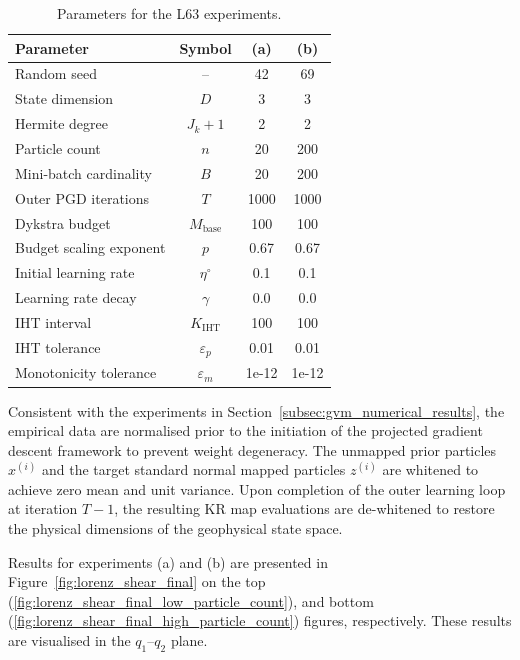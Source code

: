 \begin{table}[htbp]
    \centering
    \caption{Parameters for the L63 experiments.}
    \begin{tabular}{lccc}
        \toprule
        \textbf{Parameter} & \textbf{Symbol} & \textbf{(a)} & \textbf{(b)} \\
        \midrule
        Random seed & --                            & 42 & 69 \\
        State dimension & $D$                       & 3 & 3 \\
        Hermite degree & $J_k + 1$                  & 2 & 2 \\
        Particle count & $n$                        & 20 & 200 \\
        Mini-batch cardinality & $B$                & 20 & 200 \\
        Outer PGD iterations & $T$                  & 1000 & 1000 \\
        Dykstra budget & $M_{\mathrm{base}}$        & 100 & 100 \\
        Budget scaling exponent & $p$               & 0.67 & 0.67 \\
        Initial learning rate & $\eta^\circ$        & 0.1 & 0.1 \\
        Learning rate decay & $\gamma$              & 0.0 & 0.0 \\
        IHT interval & $K_{\mathrm{IHT}}$           & 100 & 100 \\
        IHT tolerance & $\varepsilon_p$             & 0.01 & 0.01 \\
        Monotonicity tolerance & $\varepsilon_m$    & 1e-12 & 1e-12 \\
        \bottomrule
    \end{tabular}
    \label{tab:lorenz_optimisation_parameters}
\end{table}

Consistent with the experiments in Section~\ref{subsec:gvm_numerical_results}, the empirical data are normalised prior to the initiation of the projected gradient descent framework to prevent weight degeneracy. The unmapped prior particles $x^{(i)}$ and the target standard normal mapped particles $z^{(i)}$ are whitened to achieve zero mean and unit variance. Upon completion of the outer learning loop at iteration $T-1$, the resulting KR map evaluations are de-whitened to restore the physical dimensions of the geophysical state space.

Results for experiments (a) and (b) are presented in Figure~\ref{fig:lorenz_shear_final} on the top (\ref{fig:lorenz_shear_final_low_particle_count}), and bottom (\ref{fig:lorenz_shear_final_high_particle_count}) figures, respectively. These results are visualised in the $q_1$--$q_2$ plane.

